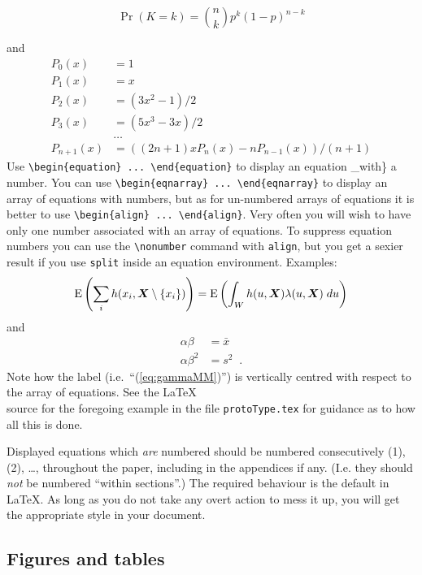 \documentclass[
  times,
  doublespace]{anzsauth}
\begin{document}
\[\Pr(K = k) = \binom{n}{k} p^k (1-p)^{n-k}\]

and \begin{align*}
P_0(x) &= 1 \\
P_1(x) &= x \\
P_2(x) &= (3x^2 - 1)/2 \\
P_3(x) &= (5x^3 - 3x)/2 \\
       & \ldots \\
P_{n+1}(x) &= ((2n+1)xP_n(x) - nP_{n-1}(x))/(n+1)
\end{align*} Use
\texttt{\textbackslash{}begin\{equation\}\ ...\ \textbackslash{}end\{equation\}}
to display an equation \_with\} a number. You can use
\texttt{\textbackslash{}begin\{eqnarray\}\ ...\ \textbackslash{}end\{eqnarray\}}
to display an array of equations with numbers, but as for un-numbered
arrays of equations it is better to use
\texttt{\textbackslash{}begin\{align\}\ ...\ \textbackslash{}end\{align\}}.
Very often you will wish to have only one number associated with an
array of equations. To suppress equation numbers you can use the
\texttt{\textbackslash{}nonumber} command with \texttt{align}, but you
get a sexier result if you use \texttt{split} inside an equation
environment. Examples: \begin{equation}
\mbox{$\textrm{\textup{E}}$} \left (\sum_i h(x_i,\mbox{$\boldsymbol{X}$} \setminus \{x_i\}) \right )
= \mbox{$\textrm{\textup{E}}$} \left ( \int_W h(u,\mbox{$\boldsymbol{X}$}) \lambda(u,\mbox{$\boldsymbol{X}$}) \; du \right )
\label{eq:GNZ}
\end{equation} and \begin{equation}
\begin{split}
\alpha \beta &= \bar{x} \\
\alpha \beta^2 &= s^2 \;\; .
\end{split}
\label{eq:gammaMM}
\end{equation} Note how the label (i.e.~``(\ref{eq:gammaMM})'') is
vertically centred with respect to the array of equations. See the
\LaTeX\\
source for the foregoing example in the file \texttt{protoType.tex} for
guidance as to how all this is done.

\noindent Displayed equations which \emph{are} numbered should be
numbered consecutively (1), (2), \ldots, throughout the paper, including
in the appendices if any. (I.e. they should \emph{not} be numbered
``within sections''.) The required behaviour is the default in \LaTeX.
As long as you do not take any overt action to mess it up, you will get
the appropriate style in your document.

\subsection{Figures and tables}\label{sec:figAndTab}
\end{document}

